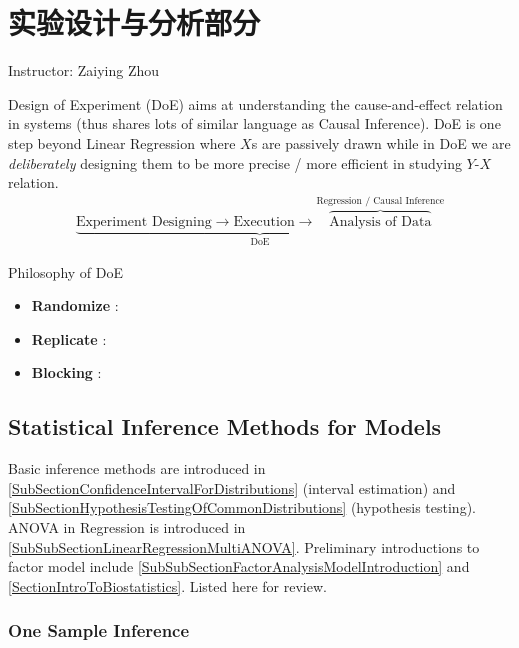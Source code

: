 \chapter{实验设计与分析部分}\label{SectionDoE}
\begin{center}
    Instructor: Zaiying Zhou
\end{center}

Design of Experiment (DoE) aims at understanding the cause-and-effect relation in systems (thus shares lots of similar language as Causal Inference). DoE is one step beyond Linear Regression where $ X $s are passively drawn while in DoE we are \textit{deliberately} designing them to be more precise / more efficient in studying $ Y$-$X $ relation.
\begin{align*}
    \underbrace{\text{Experiment Designing}\longrightarrow \text{Execution}\longrightarrow \overbrace{\text{Analysis of Data}}^{\text{Regression / Causal Inference}}}_{\text{DoE}}
\end{align*}

\begin{point}
    Philosophy of DoE 
\end{point}

\begin{itemize}[topsep=2pt,itemsep=0pt]
    \item \textbf{ Randomize }:
    \item \textbf{ Replicate  }:
    \item \textbf{ Blocking  }: 
\end{itemize}

    

\section{Statistical Inference Methods for Models}

Basic inference methods are introduced in \autoref{SubSectionConfidenceIntervalForDistributions} (interval estimation) and \autoref{SubSectionHypothesisTestingOfCommonDistributions} (hypothesis testing). ANOVA in Regression is introduced in \autoref{SubSubSectionLinearRegressionMultiANOVA}. Preliminary introductions to factor model include \autoref{SubSubSectionFactorAnalysisModelIntroduction} and \autoref{SectionIntroToBiostatistics}. Listed here for review.


\subsection{One Sample Inference}

